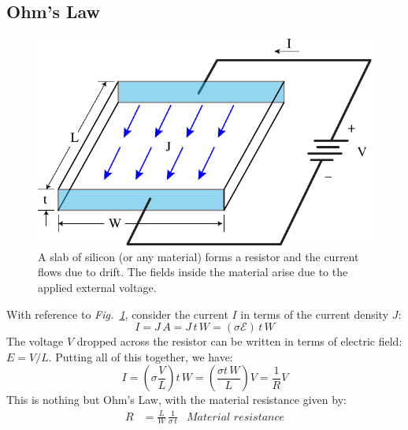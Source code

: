 \subsection{Ohm’s Law}
\begin{figure}[tb]
\centering
\includegraphics[width=.5\columnwidth]{ohms_law_slab}
\caption{A slab of silicon (or any material) forms a resistor and the current flows due to drift.  The fields inside the material arise due to the applied external voltage.}
\label{fig:ohms_law_slab}
\end{figure}
With reference to \emph{Fig.~\ref{fig:ohms_law_slab}}, consider the current $I$ in terms of the current density $J$:
    \begin{equation*}
         I = J\,A = J\,t\,W = (\sigma \mathcal{E})\,t\,W
    \end{equation*}   
The voltage $V$ dropped across the resistor can be written in terms of electric field:  $E = V/L$.  Putting all of this together, we have:
    \begin{equation*} 
        I =  \left( \sigma\frac{V}{L} \right) t\,W = \left( \frac{\sigma t\,W} {L} \right)  V= \frac{1}{R} V
    \end{equation*}
This is nothing but Ohm's Law, with the material resistance given by:
    \begin{align} 
        R &= \frac{L}{W}\,\frac{1}{{\sigma \,t}} &\textit{Material resistance} 
    \end{align}
